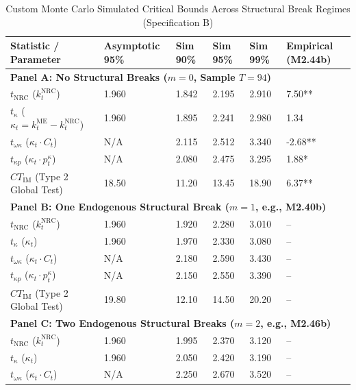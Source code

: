 \FloatBarrier
\begin{table}[H]
	\centering
	\caption{Custom Monte Carlo Simulated Critical Bounds Across Structural Break Regimes (Specification B)}
	\label{tab:mc_spec_b_full_break_bounds}
	\begin{tabular}{p{4.2cm} p{2.2cm} p{1.8cm} p{1.8cm} p{1.8cm} p{2.0cm}}
		\toprule
		\textbf{Statistic / Parameter} & \textbf{Asymptotic 95\%} & \textbf{Sim 90\%} & \textbf{Sim 95\%} & \textbf{Sim 99\%} & \textbf{Empirical (M2.44b)} \\
		\midrule
		\multicolumn{6}{l}{\textbf{Panel A: No Structural Breaks ($m=0$, Sample $T=94$)}} \\
		\midrule
		$t_{\text{NRC}}$ ($k^{\text{NRC}}_t$) & 1.960 & 1.842 & 2.195 & 2.910 & 7.50** \\
		$t_{\kappa}$ ($\kappa_t = k^{\text{ME}}_t - k^{\text{NRC}}_t$) & 1.960 & 1.895 & 2.241 & 2.980 & 1.34 \\
		$t_{\omega \kappa}$ ($\kappa_t \cdot C_t$) & N/A & 2.115 & 2.512 & 3.340 & -2.68** \\
		$t_{\kappa p}$ ($\kappa_t \cdot p^{\kappa}_t$) & N/A & 2.080 & 2.475 & 3.295 & 1.88* \\
		$CT_{\text{IM}}$ (Type 2 Global Test) & 18.50 & 11.20 & 13.45 & 18.90 & 6.37** \\
		\midrule
		\multicolumn{6}{l}{\textbf{Panel B: One Endogenous Structural Break ($m=1$, e.g., M2.40b)}} \\
		\midrule
		$t_{\text{NRC}}$ ($k^{\text{NRC}}_t$) & 1.960 & 1.920 & 2.280 & 3.010 & -- \\
		$t_{\kappa}$ ($\kappa_t$) & 1.960 & 1.970 & 2.330 & 3.080 & -- \\
		$t_{\omega \kappa}$ ($\kappa_t \cdot C_t$) & N/A & 2.180 & 2.590 & 3.430 & -- \\
		$t_{\kappa p}$ ($\kappa_t \cdot p^{\kappa}_t$) & N/A & 2.150 & 2.550 & 3.390 & -- \\
		$CT_{\text{IM}}$ (Type 2 Global Test) & 19.80 & 12.10 & 14.50 & 20.20 & -- \\
		\midrule
		\multicolumn{6}{l}{\textbf{Panel C: Two Endogenous Structural Breaks ($m=2$, e.g., M2.46b)}} \\
		\midrule
		$t_{\text{NRC}}$ ($k^{\text{NRC}}_t$) & 1.960 & 1.995 & 2.370 & 3.120 & -- \\
		$t_{\kappa}$ ($\kappa_t$) & 1.960 & 2.050 & 2.420 & 3.190 & -- \\
		$t_{\omega \kappa}$ ($\kappa_t \cdot C_t$) & N/A & 2.250 & 2.670 & 3.520 & -- \\

\end{tabular}
\end{table}
